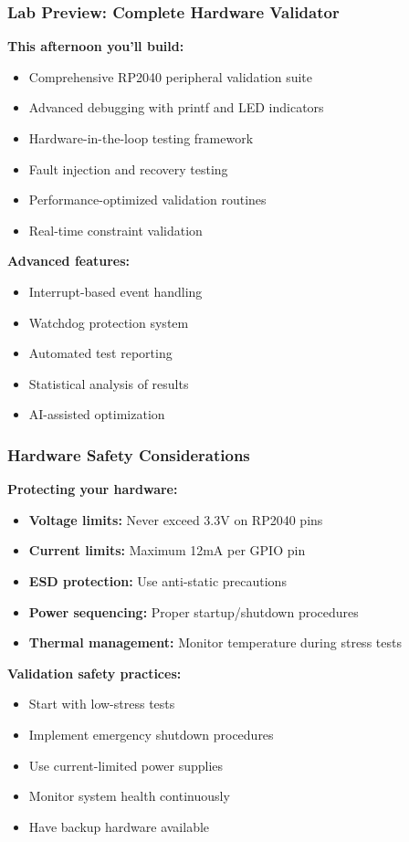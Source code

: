 \documentclass{beamer}
\begin{document}
\begin{frame}
\frametitle{Lab Preview: Complete Hardware Validator}
\textbf{This afternoon you'll build:}
\begin{itemize}
    \item Comprehensive RP2040 peripheral validation suite
    \item Advanced debugging with printf and LED indicators
    \item Hardware-in-the-loop testing framework
    \item Fault injection and recovery testing
    \item Performance-optimized validation routines
    \item Real-time constraint validation
\end{itemize}

\vspace{0.5cm}
\textbf{Advanced features:}
\begin{itemize}
    \item Interrupt-based event handling
    \item Watchdog protection system
    \item Automated test reporting
    \item Statistical analysis of results
    \item AI-assisted optimization
\end{itemize}
\end{frame}

\begin{frame}
\frametitle{Hardware Safety Considerations}
\textbf{Protecting your hardware:}
\begin{itemize}
    \item \textbf{Voltage limits:} Never exceed 3.3V on RP2040 pins
    \item \textbf{Current limits:} Maximum 12mA per GPIO pin
    \item \textbf{ESD protection:} Use anti-static precautions
    \item \textbf{Power sequencing:} Proper startup/shutdown procedures
    \item \textbf{Thermal management:} Monitor temperature during stress tests
\end{itemize}

\vspace{0.5cm}
\textbf{Validation safety practices:}
\begin{itemize}
    \item Start with low-stress tests
    \item Implement emergency shutdown procedures
    \item Use current-limited power supplies
    \item Monitor system health continuously
    \item Have backup hardware available
\end{itemize}
\end{frame}
\end{document}

